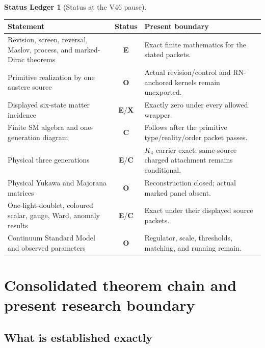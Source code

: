\documentclass[11pt,oneside,openany]{book}
\numberwithin{equation}{chapter}
\theoremstyle{definition}
\newtheorem{ledger}[theorem]{Status Ledger}
\theoremstyle{remark}
\newcommand{\statusE}{\textcolor{ExactColor}{\textbf{E}}}
\newcommand{\statusC}{\textcolor{CondColor}{\textbf{C}}}
\newcommand{\statusO}{\textcolor{OpenColor}{\textbf{O}}}
\newcommand{\statusX}{\textcolor{SuperColor}{\textbf{X}}}
\begin{document}
\begin{ledger}[Status at the V46 pause]
\begin{center}
\begin{tabularx}{0.97\textwidth}{@{}p{}cX@{}}
\toprule
Statement & Status & Present boundary\\
\midrule
Revision, screen, reversal, Maslov, process, and marked-Dirac theorems
& \statusE & Exact finite mathematics for the stated packets.\\
Primitive realization by one austere source
& \statusO & Actual revision/control and RN-anchored kernels remain unexported.\\
Displayed six-state matter incidence
& \statusE/\statusX & Exactly zero under every allowed wrapper.\\
Finite SM algebra and one-generation diagram
& \statusC & Follows after the primitive type/reality/order packet passes.\\
Physical three generations
& \statusE/\statusC & \(K_4\) carrier exact; same-source charged attachment remains conditional.\\
Physical Yukawa and Majorana matrices
& \statusO & Reconstruction closed; actual marked panel absent.\\
One-light-doublet, coloured scalar, gauge, Ward, anomaly results
& \statusE/\statusC & Exact under their displayed source packets.\\
Continuum Standard Model and observed parameters
& \statusO & Regulator, scale, thresholds, matching, and running remain.\\
\bottomrule
\end{tabularx}
\end{center}
\end{ledger}

\part{Consolidated theorem chain and present research boundary}
\label{part:v6-final}

\chapter{What is established exactly}
\label{ch:exact-core}
\end{document}

